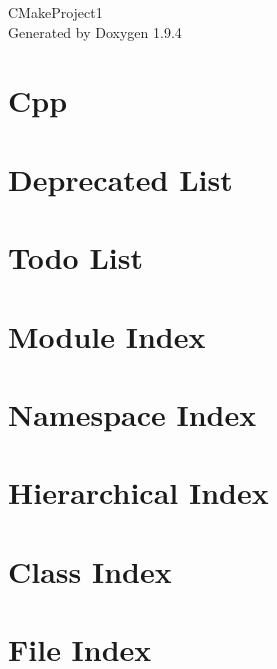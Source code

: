 \documentclass[twoside]{book}
\newcommand{\+}{\discretionary{\mbox{\scriptsize$\hookleftarrow$}}{}{}}
\newcommand{\clearemptydoublepage}{%
    \newpage{\pagestyle{empty}\cleardoublepage}%
  }
\begin{document}
  \raggedbottom
    \hypersetup{pageanchor=false,
                bookmarksnumbered=true,
                pdfencoding=unicode
               }
  \begin{titlepage}
  \vspace*{7cm}
  \begin{center}%
  {\Large CMake\+Project1}\\
  \vspace*{1cm}
  {\large Generated by Doxygen 1.9.4}\\
  \end{center}
  \end{titlepage}
  \clearemptydoublepage
  \tableofcontents
  \clearemptydoublepage
  \hypersetup{pageanchor=true}
\chapter{Cpp}
\label{md__r_e_a_d_m_e}

\chapter{Deprecated List}
\label{deprecated}

\chapter{Todo List}
\label{todo}

\chapter{Module Index}

\chapter{Namespace Index}

\chapter{Hierarchical Index}

\chapter{Class Index}

\chapter{File Index}

\end{document}
